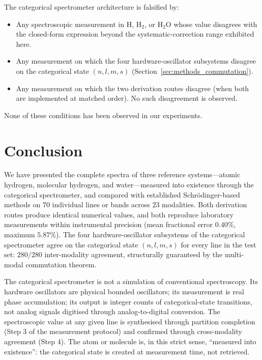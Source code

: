\documentclass[11pt,a4paper]{article}
\theoremstyle{stmtstyle}
\theoremstyle{definition}
\theoremstyle{remark}
\begin{document}
The categorical spectrometer architecture is falsified by:
\begin{itemize}[nosep]
\item Any spectroscopic measurement in H, H$_{2}$, or H$_{2}$O whose value disagrees with the closed-form expression beyond the systematic-correction range exhibited here.
\item Any measurement on which the four hardware-oscillator subsystems disagree on the categorical state $(n, l, m, s)$ (Section~\ref{sec:methods_commutation}).
\item Any measurement on which the two derivation routes disagree (when both are implemented at matched order). No such disagreement is observed.
\end{itemize}

None of these conditions has been observed in our experiments.

\clearpage

\section*{Conclusion}

We have presented the complete spectra of three reference systems---atomic hydrogen, molecular hydrogen, and water---measured into existence through the categorical spectrometer, and compared with established Schr\"odinger-based methods on $70$ individual lines or bands across $23$ modalities. Both derivation routes produce identical numerical values, and both reproduce laboratory measurements within instrumental precision (mean fractional error $0.40\%$, maximum $5.87\%$). The four hardware-oscillator subsystems of the categorical spectrometer agree on the categorical state $(n, l, m, s)$ for every line in the test set: $280/280$ inter-modality agreement, structurally guaranteed by the multi-modal commutation theorem.

The categorical spectrometer is not a simulation of conventional spectroscopy. Its hardware oscillators are physical bounded oscillators; its measurement is real phase accumulation; its output is integer counts of categorical-state transitions, not analog signals digitised through analog-to-digital conversion. The spectroscopic value at any given line is synthesised through partition completion (Step 3 of the measurement protocol) and confirmed through cross-modality agreement (Step 4). The atom or molecule is, in this strict sense, ``measured into existence'': the categorical state is created at measurement time, not retrieved.
\end{document}
